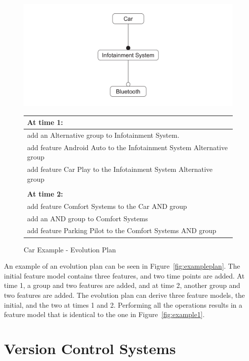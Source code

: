 \documentclass[a4paper,english]{ifimaster}
\begin{document}
\begin{figure}[htpb]
	\centering
	\includegraphics[width=0.8\linewidth]{illustrations/initial.pdf}
	\begin{tabular}{l}
		\textbf{At time 1:}                                           \\ \hline
		add an Alternative group to Infotainment System.                      \\
		add feature Android Auto to the Infotainment System Alternative group \\
		add feature Car Play to the Infotainment System Alternative group     \\
		\\
		\textbf{At time 2:}                                           \\ \hline
		add feature Comfort Systems to the Car AND group              \\
		add an AND group to Comfort Systems                           \\
		add feature Parking Pilot to the Comfort Systems AND group
	\end{tabular}
	\caption{Car Example - Evolution Plan}%
	\label{fig:exampleplan}
\end{figure}

An example of an evolution plan can be seen in Figure~\vref{fig:exampleplan}. The initial feature model contains three features, and two time points are added. At time 1, a group and two features are added, and at time 2, another group and two features are added. The evolution plan can derive three feature models, the initial, and the two at times 1 and 2. Performing all the operations results in a feature model that is identical to the one in Figure~\vref{fig:example1}.

\section{Version Control Systems}%
\label{sec:version_control_systems}
\end{document}
